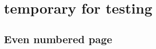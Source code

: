 \documentclass[twoside]{article}
\begin{document}
\tableofcontents

\cleardoublepage{}

\section{temporary for testing}
\newpage
\subsection{Even numbered page}
%
\end{document}
